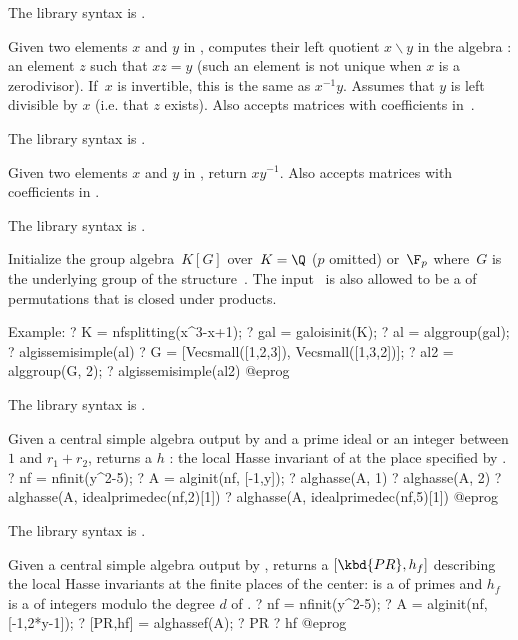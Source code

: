 The library syntax is .

\label{se:algdivl}
Given two elements $x$ and $y$ in , computes their left quotient
$x\backslash y$ in the algebra : an element $z$ such that $xz=y$ (such
an element is not unique when $x$ is a zerodivisor). If~$x$ is invertible, this
is the same as $x^{-1}y$. Assumes that $y$ is left divisible by $x$ (i.e. that
$z$ exists). Also accepts matrices with coefficients in~.

The library syntax is .

\label{se:algdivr}
Given two elements $x$ and $y$ in , return $xy^{-1}$. Also accepts
matrices with coefficients in .

The library syntax is .

\label{se:alggroup}
Initialize the group algebra~$K[G]$ over~$K=\Q$ ($p$ omitted) or~$\F_p$
where~$G$ is the underlying group of the  structure~.
The input~ is also allowed to be a  of permutations that is
closed under products.

Example:
\bprog
? K = nfsplitting(x^3-x+1);
? gal = galoisinit(K);
? al = alggroup(gal);
? algissemisimple(al)
? G = [Vecsmall([1,2,3]), Vecsmall([1,3,2])];
? al2 = alggroup(G, 2);
? algissemisimple(al2)
@eprog

The library syntax is .

\label{se:alghasse}
Given a central simple algebra  output by  and a prime
ideal or an integer between $1$ and $r_1+r_2$, returns a  $h$ : the
local Hasse invariant of  at the place specified by .
\bprog
? nf = nfinit(y^2-5);
? A = alginit(nf, [-1,y]);
? alghasse(A, 1)
? alghasse(A, 2)
? alghasse(A, idealprimedec(nf,2)[1])
? alghasse(A, idealprimedec(nf,5)[1])
@eprog

The library syntax is .

\label{se:alghassef}
Given a central simple algebra  output by , returns
a  $[\kbd{PR}, h_f]$ describing the local Hasse invariants at the
finite places of the center:  is a  of primes and $h_f$ is a
 of integers modulo the degree $d$ of .
\bprog
? nf = nfinit(y^2-5);
? A = alginit(nf, [-1,2*y-1]);
? [PR,hf] = alghassef(A);
? PR
? hf
@eprog

